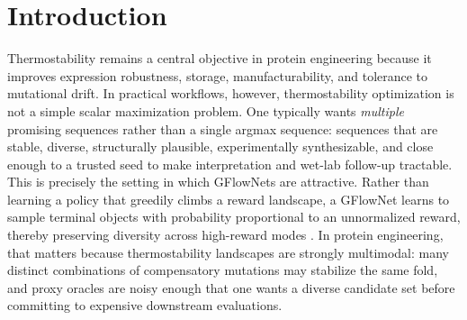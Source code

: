 \documentclass[11pt]{article}
\begin{document}
\begin{abstract}
A central design choice in the revised manuscript is how the dynamics oracles are divided by scale. When the prepared system fits within roughly $8000$ atoms, whole-protein UMA-MD is the default high-fidelity branch. In the $8000$--$10000$ atom range, downweighting UMA is a soft recommendation rather than a hard rule, and the training methodology does not include systems larger than roughly $10\,000$ atoms. A second central design choice is how the generator is positioned relative to complex design. Under the present ADFLIP-centered formulation, mixed monomer, multimer, and ligand training is a native operating mode rather than an architectural afterthought: ADFLIP already accepts all-atom context, including ligands, nucleotides, and ions, and already supports multi-state conditioning \citep{yi2025adflip}. No empirical results are fabricated or implied. Every performance statement about prior models is attributed to the corresponding source, and every newly introduced hyperparameter is explicitly labeled as a proposed default, a tunable range, or a diagnostic threshold.
\end{abstract}





\section{Introduction}

Thermostability remains a central objective in protein engineering because it improves expression robustness, storage, manufacturability, and tolerance to mutational drift. In practical workflows, however, thermostability optimization is not a simple scalar maximization problem. One typically wants \emph{multiple} promising sequences rather than a single argmax sequence: sequences that are stable, diverse, structurally plausible, experimentally synthesizable, and close enough to a trusted seed to make interpretation and wet-lab follow-up tractable. This is precisely the setting in which GFlowNets are attractive. Rather than learning a policy that greedily climbs a reward landscape, a GFlowNet learns to sample terminal objects with probability proportional to an unnormalized reward, thereby preserving diversity across high-reward modes \citep{bengio2023gflownet,malkin2022trajectory,madan2023subtb}. In protein engineering, that matters because thermostability landscapes are strongly multimodal: many distinct combinations of compensatory mutations may stabilize the same fold, and proxy oracles are noisy enough that one wants a diverse candidate set before committing to expensive downstream evaluations.
\end{document}
